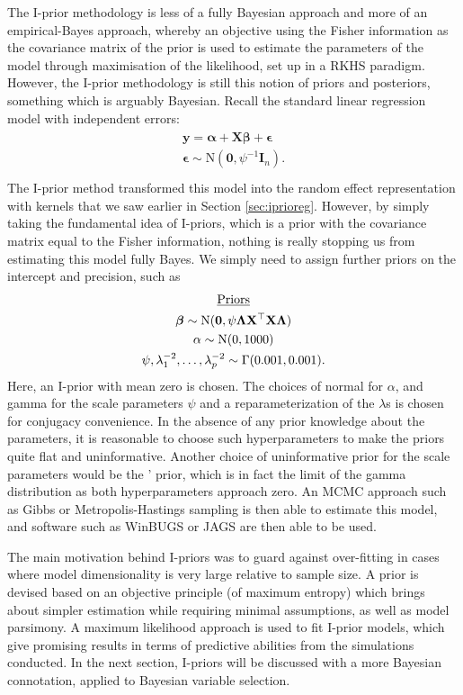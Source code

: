 The I-prior methodology is less of a fully Bayesian approach and more of an empirical-Bayes approach, whereby an objective using the Fisher information as the covariance matrix of the prior is used to estimate the parameters of the model through maximisation of the likelihood, set up in a RKHS paradigm. However, the I-prior methodology is still this notion of priors and posteriors, something which is arguably Bayesian. Recall the standard linear regression model with independent errors:
\begin{align*}
	\begin{gathered}
		\mathbf y = \boldsymbol\alpha + \mathbf X \boldsymbol\beta + \boldsymbol\epsilon \\
		\boldsymbol\epsilon \sim \text{N}(\mathbf 0, \psi^{-1}\mathbf I_n). \\
	\end{gathered}
\end{align*}
The I-prior method transformed this model into the random effect representation with kernels that we saw earlier in Section \ref{sec:iprioreg}. However, by simply taking the fundamental idea of I-priors, which is a prior with the covariance matrix equal to 
the Fisher information, nothing is really stopping us from estimating this model fully Bayes. We simply need to assign further priors on the intercept and precision, such as
\begin{align*}
	\begin{gathered}
		\text{\underline{Priors}} \\
		\boldsymbol\beta \sim \text{N}(\mathbf 0, \psi\boldsymbol\Lambda \mathbf X ^\top \mathbf X \boldsymbol\Lambda) \\
		\alpha \sim \text{N}(0, 1000) \\
		\psi, \lambda_1^{-2}, \dots, \lambda_p^{-2} \sim \Gamma(0.001, 0.001). \\
	\end{gathered}
\end{align*}
Here, an I-prior with mean zero is chosen. The choices of normal for $\alpha$, and gamma for the scale parameters $\psi$ and a reparameterization of the $\lambda$s is chosen for conjugacy convenience. In the absence of any prior knowledge about the parameters, it is reasonable to choose such hyperparameters to make the priors quite flat and uninformative. Another choice of uninformative prior for the scale parameters would be the \citeauthor{Jeffreys1946}' prior, which is in fact the limit of the gamma distribution as both hyperparameters approach zero. An MCMC approach such as Gibbs or Metropolis-Hastings sampling is then able to estimate this model, and software such as WinBUGS or JAGS are then able to be used.

The main motivation behind I-priors was to guard against over-fitting in cases where model dimensionality is very large relative to sample size. A prior is devised based on an objective principle (of maximum entropy) which brings about simpler estimation while requiring minimal assumptions, as well as model parsimony. A maximum likelihood approach is used to fit I-prior models, which give promising results in terms of predictive abilities from the simulations conducted. In the next section, I-priors will be discussed with a more Bayesian connotation, applied to Bayesian variable selection.
